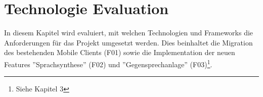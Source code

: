 \section{Technologie Evaluation}

In diesem Kapitel wird evaluiert, mit welchen Technologien und Frameworks die Anforderungen für das Projekt umgesetzt werden.
Dies beinhaltet die Migration des bestehenden Mobile Clients\cite{ip5} (F01) sowie die Implementation der neuen Features ''Sprachsynthese'' (F02) und ''Gegensprechanlage'' (F03)\footnote{Siehe Kapitel 3}.




